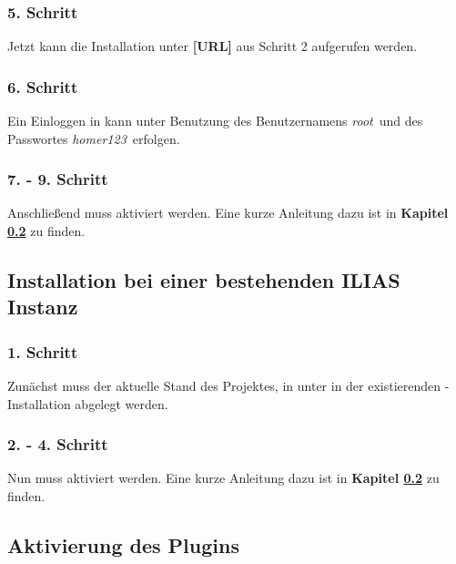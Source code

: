     \subsubsection{5. Schritt}
    
        Jetzt kann die  Installation unter \textbf{[URL]} aus Schritt 2 aufgerufen werden.
    
    \subsubsection{6. Schritt}
    
        Ein Einloggen in  kann unter Benutzung des Benutzernamens \glqq\textit{root}\grqq\ und des Passwortes \glqq\textit{homer123}\grqq\ erfolgen.
    
    \subsubsection{7. - 9. Schritt}

        Anschließend muss  aktiviert werden. Eine kurze Anleitung dazu ist in \textbf{Kapitel \ref{subsec:aktivierung-des-plugins}} zu finden.


\subsection{Installation bei einer bestehenden ILIAS Instanz}
\label{subsec:installation-bestehende-instanz}

    \subsubsection{1. Schritt}
    
        Zunächst muss der aktuelle Stand des Projektes, in unter  in der existierenden -Installation abgelegt werden.
    
    \subsubsection{2. - 4. Schritt}
        
        Nun muss  aktiviert werden. Eine kurze Anleitung dazu ist in \textbf{Kapitel \ref{subsec:aktivierung-des-plugins}} zu finden.


\subsection{Aktivierung des Plugins}
\label{subsec:aktivierung-des-plugins}

